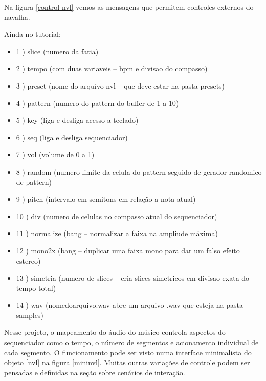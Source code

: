 \documentclass[draft]{ppgmus}
\begin{document}
Na figura \ref{control-nvl} vemos as mensagens que permitem controles externos do navalha.

Ainda no tutorial:

\begin{itemize}
\item 1 ) slice (numero da fatia) 
\item 2 ) tempo (com duas variaveis – bpm e divisao do compasso)
\item 3 ) preset (nome do arquivo nvl – que deve estar na pasta presets)
\item 4 ) pattern (numero do pattern do buffer de 1 a 10)
\item 5 ) key (liga e desliga acesso a teclado)
\item 6 ) seq (liga e desliga sequenciador)
\item 7 ) vol (volume de 0 a 1)
\item 8 ) random (numero limite da celula do pattern seguido de gerador randomico de pattern)
\item 9 ) pitch (intervalo em semitons em relação a nota atual)
\item 10 ) div (numero de celulas no compasso atual do sequenciador)
\item 11 ) normalize (bang – normalizar a faixa na ampliude máxima)
\item 12 ) mono2x (bang – duplicar uma faixa mono para dar um falso efeito estereo)
\item 13 ) simetria (numero de slices – cria slices simetricos em divisao exata do tempo total)
\item 14 ) wav (nomedoarquivo.wav abre um arquivo .wav que esteja na pasta samples)
\end{itemize}


Nesse projeto, o mapeamento do áudio do músico controla aspectos do sequenciador como o tempo,
o número de segmentos e acionamento individual de cada segmento. O funcionamento
pode ser visto numa interface minimalista do objeto [nvl] na figura \ref{mininvl}.
Muitas outras variações de controle podem
ser pensadas e definidas na seção sobre cenários de interação.






% 
% 
% 
% 
% 
% 
% 
% 
% 
% 
\end{document}
